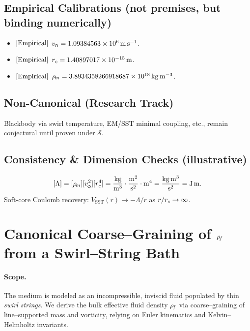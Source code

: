 \documentclass[11pt]{article}
\begin{document}
    \subsection*{Empirical Calibrations (not premises, but binding numerically)}
    \begin{itemize}
        \item \([{\rm Empirical}]\) \(\vscore = 1.09384563\times 10^6\,\mathrm{m\,s^{-1}}\).
        \item \([{\rm Empirical}]\) \(r_c = 1.40897017\times 10^{-15}\,\mathrm{m}\).
        \item \([{\rm Empirical}]\) \(\rho_{\!m} = 3.8934358266918687\times 10^{18}\,\mathrm{kg\,m^{-3}}\).
    \end{itemize}

    \subsection*{Non-Canonical (Research Track)}
    Blackbody via swirl temperature, EM/SST minimal coupling, etc., remain conjectural until proven under \(\mathcal{S}\).

    \subsection*{Consistency \& Dimension Checks (illustrative)}
    \[
        [\Lambda]=[\rhom][\vscore^2][\rc^4]
        =\frac{\mathrm{kg}}{\mathrm{m^3}}\cdot\frac{\mathrm{m^2}}{\mathrm{s^2}}\cdot\mathrm{m^4}
        =\frac{\mathrm{kg\,m^3}}{\mathrm{s^2}}
        =\mathrm{J\,m}.
    \]
    Soft-core Coulomb recovery: \(V_{\text{SST}}(r)\to -\Lambda/r\) as \(r/r_c\to\infty\).



    \section{Canonical Coarse–Graining of \(\rho_{\!f}\) from a Swirl–String Bath}
    \label{sec:canon_rhof_from_strings}

    \paragraph{Scope.}
    The medium is modeled as an incompressible, inviscid fluid populated by thin \emph{swirl strings}. We derive the bulk effective fluid density \(\rho_{\!f}\) via coarse–graining of line–supported mass and vorticity, relying on Euler kinematics and Kelvin–Helmholtz invariants.
\end{document}
